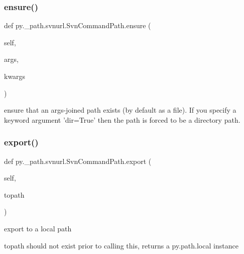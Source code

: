 \subsubsection{\texorpdfstring{ensure()}{ensure()}}
{\footnotesize\ttfamily def py.\+\_\+path.\+svnurl.\+Svn\+Command\+Path.\+ensure (\begin{DoxyParamCaption}\item[{}]{self,  }\item[{}]{args,  }\item[{}]{kwargs }\end{DoxyParamCaption})}

\begin{DoxyVerb}ensure that an args-joined path exists (by default as
    a file). If you specify a keyword argument 'dir=True'
    then the path is forced to be a directory path.
\end{DoxyVerb}
 \mbox{\label{classpy_1_1__path_1_1svnurl_1_1_svn_command_path_a15e070016e51ace4118b18bc7ee5e942}} 
\subsubsection{\texorpdfstring{export()}{export()}}
{\footnotesize\ttfamily def py.\+\_\+path.\+svnurl.\+Svn\+Command\+Path.\+export (\begin{DoxyParamCaption}\item[{}]{self,  }\item[{}]{topath }\end{DoxyParamCaption})}

\begin{DoxyVerb}export to a local path

    topath should not exist prior to calling this, returns a
    py.path.local instance
\end{DoxyVerb}
 \mbox{\label{classpy_1_1__path_1_1svnurl_1_1_svn_command_path_aaf4b361937c91ea7803582881782aa52}} 
